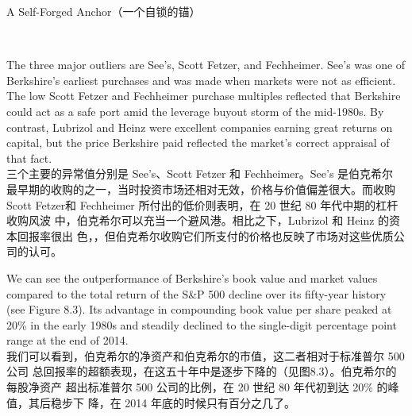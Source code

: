 \begin{section}{A Self-Forged Anchor（一个自锁的锚）}
\begin{verseparallel}
\end{verseparallel}

{\color{red}{此处缺图 8.2}} \\

\begin{verseparallel}
  {
    The three major outliers are See's, Scott Fetzer, and Fechheimer. See's
    was one of Berkshire's earliest purchases and was made when markets were
    not as efficient. The low Scott Fetzer and Fechheimer purchase multiples
    reflected that Berkshire could act as a safe port amid the leverage buyout
    storm of the mid-1980s. By contrast, Lubrizol and Heinz were excellent
    companies earning great returns on capital, but the price Berkshire paid
    reflected the market's correct appraisal of that fact. \\
  }
  {
    三个主要的异常值分别是 See’s、Scott Fetzer 和 Fechheimer。See’s 是伯克希尔
    最早期的收购的之一，当时投资市场还相对无效，价格与价值偏差很大。而收购 Scott
    Fetzer和 Fechheimer 所付出的低价则表明，在 20 世纪 80 年代中期的杠杆收购风波
    中，伯克希尔可以充当一个避风港。相比之下，Lubrizol 和 Heinz 的资本回报率很出
    色，，但伯克希尔收购它们所支付的价格也反映了市场对这些优质公司的认可。
  }
\end{verseparallel}

\begin{verseparallel}
  {
    We can see the outperformance of Berkshire's book value and market values
    compared to the total return of the S\&P 500 decline over its fifty-year
    history (see Figure 8.3). Its advantage in compounding book value per share
    peaked at 20\% in the early 1980s and steadily declined to the single-digit
    percentage point range at the end of 2014. \\
  }
  {
    我们可以看到，伯克希尔的净资产和伯克希尔的市值，这二者相对于标准普尔 500 公司
    总回报率的超额表现，在这五十年中是逐步下降的（见图8.3）。伯克希尔的每股净资产
    超出标准普尔 500 公司的比例，在 20 世纪 80 年代初到达 20\% 的峰值，其后稳步下
    降，在 2014 年底的时候只有百分之几了。
  }
\end{verseparallel}

{\color{red}{此处缺图 8.3 和图 8.4}} \\


\end{section}
